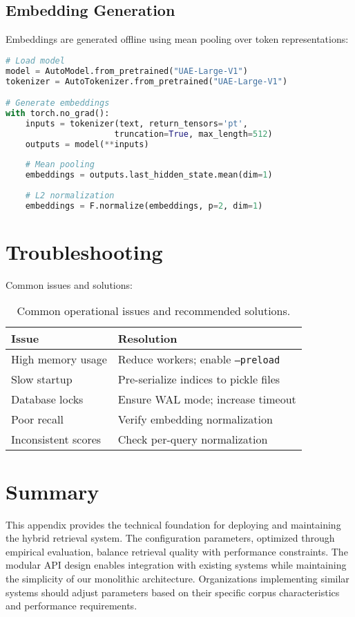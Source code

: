 \subsection{Embedding Generation}

Embeddings are generated offline using mean pooling over token representations:

\begin{lstlisting}[language=Python, caption={Embedding generation}, label={lst:embed-gen}]
# Load model
model = AutoModel.from_pretrained("UAE-Large-V1")
tokenizer = AutoTokenizer.from_pretrained("UAE-Large-V1")

# Generate embeddings
with torch.no_grad():
    inputs = tokenizer(text, return_tensors='pt', 
                      truncation=True, max_length=512)
    outputs = model(**inputs)
    
    # Mean pooling
    embeddings = outputs.last_hidden_state.mean(dim=1)
    
    # L2 normalization
    embeddings = F.normalize(embeddings, p=2, dim=1)
\end{lstlisting}

\section{Troubleshooting}
\label{sec:app-troubleshooting}

Common issues and solutions:

\begin{table}[!ht]
\centering
\small
\begin{tabular}{p{4cm}p{7cm}}
\toprule
\textbf{Issue} & \textbf{Resolution} \\
\midrule
High memory usage & Reduce workers; enable \texttt{--preload} \\
Slow startup & Pre-serialize indices to pickle files \\
Database locks & Ensure WAL mode; increase timeout \\
Poor recall & Verify embedding normalization \\
Inconsistent scores & Check per-query normalization \\
\bottomrule
\end{tabular}
\caption{Common operational issues and recommended solutions.}
\label{tab:troubleshooting}
\end{table}

\section{Summary}

This appendix provides the technical foundation for deploying and maintaining the hybrid retrieval system. The configuration parameters, optimized through empirical evaluation, balance retrieval quality with performance constraints. The modular API design enables integration with existing systems while maintaining the simplicity of our monolithic architecture. Organizations implementing similar systems should adjust parameters based on their specific corpus characteristics and performance requirements.
